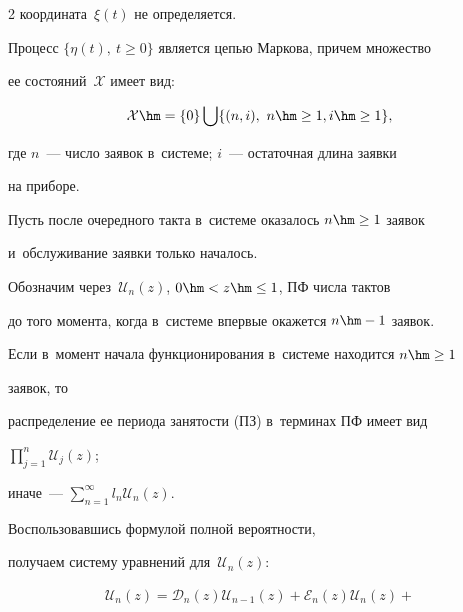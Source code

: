 \begin{multicols}{2}
координата~$\xi(t)$ не определяется.


Процесс ${\{\eta(t), \ t\ge0\}}$ является \mbox{цепью} Маркова, причем множество 


ее состояний~$\mathcal{X}$ имеет вид:


$$\mathcal{X}\hm=\{0\} \bigcup \{ (n,i), \ n \hm\ge 1, i \hm\ge 1 \},


$$


где $n$~--- число заявок в~системе; $i$~--- остаточная длина заявки


на приборе.





Пусть после очередного такта в~системе оказалось $n \hm\ge 1$ заявок 


и~обслуживание заявки только началось.


Обозначим через~$\mathcal{U}_{n}(z)$, $0\hm<z\hm\le 1$, ПФ числа тактов 


до того момента, когда в~системе впервые окажется $n\hm-1$ заявок.


Если в~момент начала функционирования в~системе находится $n \hm\ge 1$ 


заявок, то


распределение ее периода занятости (ПЗ) в~терминах ПФ имеет вид 


$\prod\nolimits_{j=1}^n \mathcal{U}_{j}(z)$;


иначе~--- $\sum\nolimits_{n=1}^\infty l_n \mathcal{U}_{n}(z)$.


Воспользовавшись формулой полной вероятности,


получаем систему уравнений для~$\mathcal{U}_{n}(z)$:












\noindent


\begin{multline}


\label{eq1}


\mathcal{U}_{n}(z)


=\mathcal{D}_{n}(z)


\mathcal{U}_{n-1}(z)


+\mathcal{E}_{n}(z)


\mathcal{U}_{n}(z)+{}\\



\end{multline}
\end{multicols}
